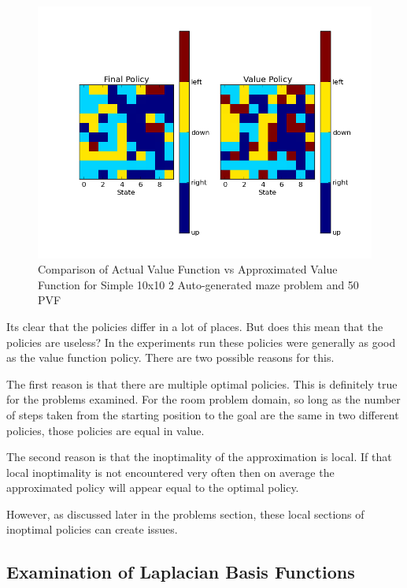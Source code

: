 \documentclass[12pt, letterpaper, final]{report}
\begin{document}
\FloatBarrier
\begin{figure}[h!]
\centering
\includegraphics[scale=.5]{images/maze01_policy_comparison_k50_s5000.png}
\caption{Comparison of Actual Value Function vs Approximated Value
  Function for Simple 10x10 2 Auto-generated maze problem and 50 PVF}
\label{policy3}
\end{figure}
\FloatBarrier

Its clear that the policies differ in a lot of places. But does this
mean that the policies are useless? In the experiments run these
policies were generally as good as the value function policy. There
are two possible reasons for this.

The first reason is that there are multiple optimal policies. This
is definitely true for the problems examined. For the room problem
domain, so long as the number of
steps taken from the starting position to the goal are the same in two
different policies, those policies are equal in value.

The second reason is that the inoptimality of the approximation is
local. If that local inoptimality is not encountered very often then
on average the approximated policy will appear equal to the optimal
policy.

However, as discussed later in the problems section, these local
sections of inoptimal policies can create issues.

\subsection*{Examination of Laplacian Basis Functions}
\end{document}
